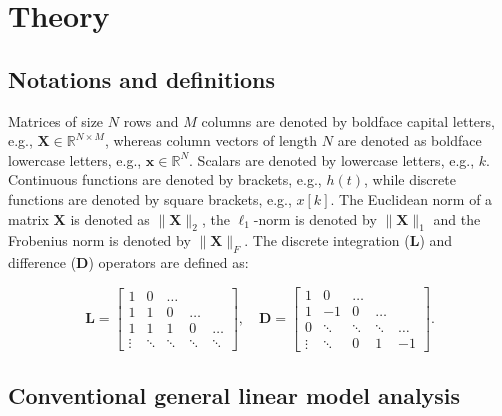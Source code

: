 
\section{Theory}

\subsection{Notations and definitions}

Matrices of size $N$ rows and $M$ columns are denoted by boldface capital
letters, e.g., $\mathbf{X} \in \mathbb{R}^{N\times M}$, whereas column vectors
of length $N$ are denoted as boldface lowercase letters, e.g., $\mathbf{x} \in
\mathbb{R}^{N}$. Scalars are denoted by lowercase letters, e.g., $k$. Continuous
functions are denoted by brackets, e.g., $h(t)$, while discrete functions are
denoted by square brackets, e.g., $x[k]$. The Euclidean norm of a matrix
$\mathbf{X}$ is denoted as $\|\mathbf{X}\|_2$, the $\ell_1$-norm is denoted by
$\| \mathbf{X} \|_1$ and the Frobenius norm is denoted by $\| \mathbf{X} \|_F$.
The discrete integration ($\mathbf{L}$) and difference ($\mathbf{D}$) operators
are defined as:

$$
\mathbf{L} = \left[\begin{array}{ccccc}
1 & 0 & \ldots & & \\
1 & 1 & 0 & \ldots & \\
1 & 1 & 1 & 0 & \ldots \\
\vdots & \ddots & \ddots & \ddots & \ddots
\end{array}\right], \quad \mathbf{D} = \left[\begin{array}{ccccc}
1 & 0 & \ldots & & \\
1 & -1 & 0 & \ldots & \\
0 & \ddots & \ddots & \ddots & \ldots \\
\vdots & \ddots & 0 & 1 & -1
\end{array}\right].
$$

\subsection{Conventional general linear model analysis}

